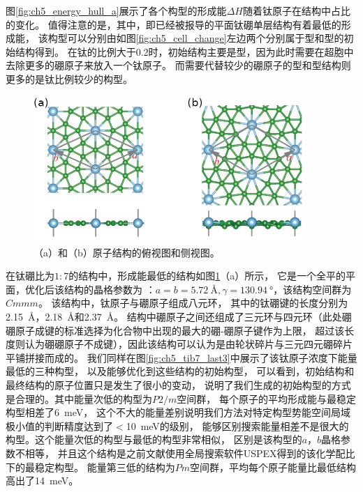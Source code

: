 图\ref{fig:ch5_energy_hull_a}展示了各个构型的形成能$\Delta H$随着钛原子在结构中占比的变化。
值得注意的是，其中，即已经被报导的平面钛硼单层结构有着最低的形成能，
该构型可以分别由如图\ref{fig:ch5_cell_change}左边两个分别属于型和型的初始结构得到。
在钛的比例大于\num{0.2}时，初始结构主要是型，因为此时需要在超胞中去除更多的硼原子来放入一个钛原子。
而需要代替较少的硼原子的型和型结构则更多的是钛比例较少的构型。

\begin{figure}[htb]
  \includegraphics[width=0.92\textwidth]{figs/ch5_energy_hull_b.png}
  \centering
  \caption{（a）和（b）原子结构的俯视图和侧视图。}
  \label{fig:ch5_energy_hull_b}
\end{figure}

在钛硼比为$1:7$的结构中，形成能最低的结构如图\ref{fig:ch5_energy_hull_b}（a）所示，
它是一个全平的平面，优化后该结构的晶格参数为
：$a=b=\SI{5.72}{\angstrom},\gamma=\SI{130.94}{\degree}$，该结构空间群为$Cmmm$。
该结构中，钛原子与硼原子组成八元环，
其中的钛硼键的长度分别为\SI{2.15}{\angstrom}，\SI{2.18}{\angstrom}和\SI{2.37}{\angstrom}。
结构中硼原子之间还组成了三元环与四元环（此处硼硼原子成键的标准选择为化合物中出现的最大的硼-硼原子键作为上限，
超过该长度则认为硼硼原子不成键），因此该结构可以认为是由轮状碎片与三元四元硼碎片平铺拼接而成的。
我们同样在图\ref{fig:ch5_tib7_last3}中展示了该钛原子浓度下能量最低的三种构型，
以及能够优化到这些结构的初始构型，
可以看到，初始结构和最终结构的原子位置只是发生了很小的变动，
说明了我们生成的初始构型的方式是合理的。其中能量次低的构型为$P2/m$空间群，
每个原子的平均形成能与最稳定构型相差了\SI{6}{\meV}，
这个不大的能量差别说明我们方法对特定构型势能空间局域极小值的判断精度达到了$<$\SI{10}{\meV}的级别，
能够区别搜索能量相差不是很大的构型。这个能量次低的构型与最低的构型非常相似，
区别是该构型的$a，b$晶格参数不相等，
并且这个结构是之前文献\cite{wang2017semimetallic}使用全局搜索软件USPEX得到的该化学配比下的最稳定构型。
能量第三低的结构为$Pm$空间群，平均每个原子能量比最低结构高出了\SI{14}{\meV}。

